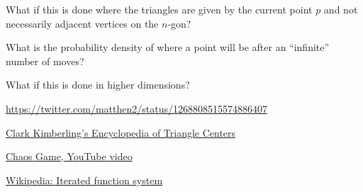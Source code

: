 \documentclass{article}
\begin{document}
\begin{related}
  \item What if this is done where the triangles are given by
  the current point $p$ and not necessarily adjacent vertices on the $n$-gon?
  \item What is the probability density of where a point will be after an
  ``infinite'' number of moves?
  \item What if this is done in higher dimensions?
\end{related}

\begin{references}
  \item \url{https://twitter.com/matthen2/status/1268808515574886407}
  \item \href{https://faculty.evansville.edu/ck6/encyclopedia/etc.html}{Clark Kimberling's Encyclopedia of Triangle Centers}
  \item \href{https://www.youtube.com/watch?v=IGlGvSXkRGI}{Chaos Game, YouTube video}
  \item \href{https://en.wikipedia.org/wiki/Iterated_function_system}{Wikipedia: Iterated function system}
\end{references}
\end{document}
